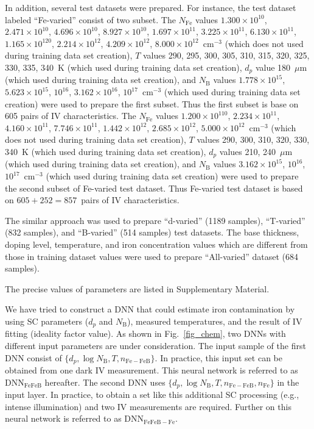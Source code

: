 \documentclass[num-refs]{wiley-article} %
\begin{document}
In addition, several test datasets were prepared.
For instance, the test dataset labeled ``Fe-varied'' consist of two subset.
The $N_{\mathrm{Fe}}$ values
$1.300\times10^{10}$, $2.471\times10^{10}$, $4.696\times10^{10}$,
$8.927\times10^{10}$, $1.697\times10^{11}$, $3.225\times10^{11}$,
$6.130\times10^{11}$, $1.165\times10^{120}$, $2.214\times10^{12}$,
$4.209\times10^{12}$, $8.000\times10^{12}$~cm$^{-3}$
(which does not used during training data set creation),
$T$ values 290, 295, 300, 305, 310, 315, 320, 325, 330, 335, 340~K
(which used during training data set creation),
$d_p$ value 180~$\mu$m (which used during training data set creation),
and $N_\mathrm{B}$ values
$1.778\times10^{15}$, $5.623\times10^{15}$, $10^{16}$,
$3.162\times10^{16}$, $10^{17}$~cm$^{-3}$
(which used during training data set creation)
were used to prepare the first subset.
Thus the first subset is base on 605 pairs of IV characteristics.
The $N_{\mathrm{Fe}}$ values
$1.200\times10^{110}$, $2.234\times10^{11}$, $4.160\times10^{11}$,
$7.746\times10^{11}$, $1.442\times10^{12}$, $2.685\times10^{12}$,
$5.000\times10^{12}$~cm$^{-3}$
(which does not used during training data set creation),
$T$ values 290, 300, 310, 320, 330, 340~K
(which used during training data set creation),
$d_p$ values 210, 240~$\mu$m (which used during training data set creation),
and $N_\mathrm{B}$ values
$3.162\times10^{15}$, $10^{16}$,
$10^{17}$~cm$^{-3}$
(which used during training data set creation)
were used to prepare the second subset of Fe-varied test dataset.
Thus Fe-varied test dataset is based on $605+252=857$~pairs of IV characteristics.

The similar approach was used to prepare ``d-varied'' (1189 samples), ``T-varied'' (832 samples), and ``B-varied'' (514 samples) test datasets.
The base thickness, doping level, temperature, and iron concentration values
which are different from those in training dataset values were used to prepare ``All-varied'' dataset (684 samples).

The precise values of parameters are listed in Supplementary Material.

We have tried to construct a DNN that could estimate iron contamination by using
SC parameters ($d_p$ and $N_\mathrm{B}$), measured temperatures, and the result of IV fitting (ideality factor value).
As shown in Fig.~\ref{fig_chem}, two DNNs with different input parameters are under consideration.
The input sample of the first DNN consist of $\{d_p,\log N_\mathrm{B},T,n_\mathrm{Fe-FeB}\}$.
In practice, this input set can be obtained from one dark IV measurement.
This neural network is referred to as DNN$_\mathrm{FeFeB}$ hereafter.
The second DNN uses  $\{d_p,\log N_\mathrm{B},T,n_\mathrm{Fe-FeB},n_\mathrm{Fe}\}$ in the input layer.
In practice, to obtain a set like this additional SC processing (e.g., intense illumination) and two IV measurements are required.
Further on this neural network is referred to as DNN$_\mathrm{FeFeB-Fe}$.
\end{document}
